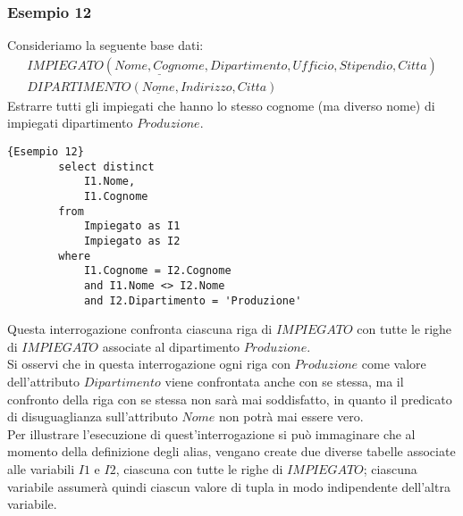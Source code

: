 \subsubsection{Esempio 12}
Consideriamo la seguente base dati:
    \begin{equation}\begin{aligned}
        IMPIEGATO (\underline{Nome, Cognome}, Dipartimento, Ufficio, Stipendio, Citta)\\
        DIPARTIMENTO (\underline{Nome}, Indirizzo, Citta)
    \end{aligned}\end{equation}
Estrarre tutti gli impiegati che hanno lo stesso cognome (ma diverso nome) di impiegati dipartimento $Produzione$.
    \begin{lstlisting}{Esempio 12}
        select distinct
            I1.Nome,
            I1.Cognome
        from 
            Impiegato as I1
            Impiegato as I2
        where 
            I1.Cognome = I2.Cognome
            and I1.Nome <> I2.Nome
            and I2.Dipartimento = 'Produzione'
    \end{lstlisting}
Questa interrogazione confronta ciascuna riga di $IMPIEGATO$ con tutte le righe di $IMPIEGATO$ associate al dipartimento $Produzione$. \\
Si osservi che in questa interrogazione ogni riga con $Produzione$ come valore dell'attributo $Dipartimento$ viene confrontata anche con se stessa, ma il confronto della riga con se stessa non sarà mai soddisfatto, in quanto il predicato di disuguaglianza sull'attributo $Nome$ non potrà mai essere vero.\\
Per illustrare l'esecuzione di quest'interrogazione si può immaginare che al momento della definizione degli alias, vengano create due diverse tabelle associate alle variabili $I1$ e $I2$, ciascuna con tutte le righe di $IMPIEGATO$; ciascuna variabile assumerà quindi ciascun valore di tupla in modo indipendente dell'altra variabile.





